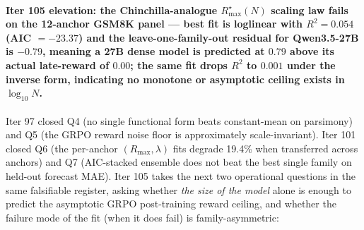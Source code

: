%
\paragraph{Iter 105 elevation: the Chinchilla-analogue $R_\mathrm{max}^\star(N)$ scaling law fails on the 12-anchor GSM8K panel --- best fit is loglinear with $R^2 = 0.054$ (AIC $=-23.37$) and the leave-one-family-out residual for Qwen3.5-27B is $-0.79$, meaning a 27B dense model is predicted at $0.79$ above its actual late-reward of $0.00$; the same fit drops $R^2$ to $0.001$ under the inverse form, indicating no monotone or asymptotic ceiling exists in $\log_{10}N$.}
\label{par:scaling-iter105}

Iter 97 closed Q4 (no single functional form beats constant-mean on
parsimony) and Q5 (the GRPO reward noise floor is approximately
scale-invariant).  Iter 101 closed Q6 (the per-anchor
$(R_\mathrm{max},\lambda)$ fits degrade 19.4\% when transferred across
anchors) and Q7 (AIC-stacked ensemble does not beat the best single
family on held-out forecast MAE).  Iter 105 takes the next two
operational questions in the same falsifiable register, asking whether
\emph{the size of the model} alone is enough to predict the asymptotic
GRPO post-training reward ceiling, and whether the failure mode of the
fit (when it does fail) is family-asymmetric:


